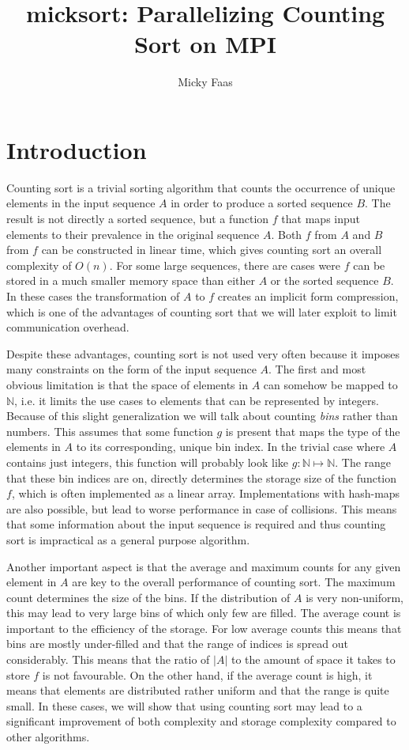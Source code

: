 \documentclass[10pt,a4paper]{article}
\author{Micky Faas}
\title{micksort: Parallelizing Counting Sort on MPI}
\begin{document}
\maketitle
\section{Introduction}
Counting sort is a trivial sorting algorithm that counts the occurrence of unique elements in the input sequence $A$ in order to produce a sorted sequence $B$. The result is not directly a sorted sequence, but a function $f$ that maps input elements to their prevalence in the original sequence $A$. Both $f$ from $A$ and $B$ from $f$ can be constructed in linear time, which gives counting sort an overall complexity of $O(n)$. For some large sequences, there are cases were $f$ can be stored in a much smaller memory space than either $A$ or the sorted sequence $B$. In these cases the transformation of $A$ to $f$ creates an implicit form compression, which is one of the advantages of counting sort that we will later exploit to limit communication overhead.

Despite these advantages, counting sort is not used very often because it imposes many constraints on the form of the input sequence $A$. The first and most obvious limitation is that the space of elements in $A$ can somehow be mapped to $\mathbb{N}$, i.e. it limits the use cases to elements that can be represented by integers. Because of this slight generalization we will talk about counting \emph{bins} rather than numbers. This assumes that some function $g$ is present that maps the type of the elements in $A$ to its corresponding, unique bin index. In the trivial case where $A$ contains just integers, this function will probably look like $g: \mathbb{N} \mapsto \mathbb{N}$. The range that these bin indices are on, directly determines the storage size of the function $f$, which is often implemented as a linear array. Implementations with hash-maps are also possible, but lead to worse performance in case of collisions. This means that some information about the input sequence is required and thus counting sort is impractical as a general purpose algorithm. 

Another important aspect is that the average and maximum counts for any given element in $A$ are key to the overall performance of counting sort. The maximum count determines the size of the bins. If the distribution of $A$ is very non-uniform, this may lead to very large bins of which only few are filled. The average count is important to the efficiency of the storage. For low average counts this means that bins are mostly under-filled and that the range of indices is spread out considerably. This means that the ratio of $|A|$ to the amount of space it takes to store $f$ is not favourable. On the other hand, if the average count is high, it means that elements are distributed rather uniform and that the range is quite small. In these cases, we will show that using counting sort may lead to a significant improvement of both complexity and storage complexity compared to other algorithms.
\end{document}
